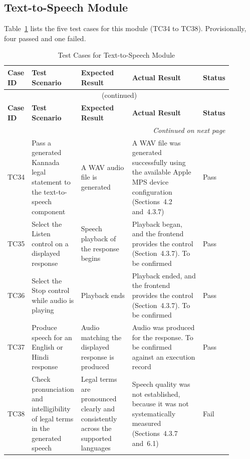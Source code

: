 \documentclass[12pt,a4paper,oneside]{report}
\begin{document}
\subsection{Text-to-Speech Module}
Table~\ref{tab:tts} lists the five test cases for this module (TC34 to TC38). Provisionally, four passed and one failed.
{\footnotesize
\setlength{\tabcolsep}{3pt}
\renewcommand{\arraystretch}{1.15}
\begin{longtable}{|p{0.075\linewidth}|p{0.19\linewidth}|p{0.23\linewidth}|p{0.32\linewidth}|p{0.08\linewidth}|}
\caption{Test Cases for Text-to-Speech Module}\label{tab:tts}\\
\hline
\textbf{Case ID} & \textbf{Test Scenario} & \textbf{Expected Result} & \textbf{Actual Result} & \textbf{Status}\\
\hline
\endfirsthead
\multicolumn{5}{c}{\tablename~\thetable{} (continued)}\\
\hline
\textbf{Case ID} & \textbf{Test Scenario} & \textbf{Expected Result} & \textbf{Actual Result} & \textbf{Status}\\
\hline
\endhead
\hline
\multicolumn{5}{r}{\emph{Continued on next page}}\\
\endfoot
\hline
\endlastfoot
TC34 & Pass a generated Kannada legal statement to the text-to-speech component & A WAV audio file is generated & A WAV file was generated successfully using the available Apple MPS device configuration (Sections~4.2 and~4.3.7) & Pass\\
\hline
TC35 & Select the Listen control on a displayed response & Speech playback of the response begins & Playback began, and the frontend provides the control (Section~4.3.7). To be confirmed & Pass\\
\hline
TC36 & Select the Stop control while audio is playing & Playback ends & Playback ended, and the frontend provides the control (Section~4.3.7). To be confirmed & Pass\\
\hline
TC37 & Produce speech for an English or Hindi response & Audio matching the displayed response is produced & Audio was produced for the response. To be confirmed against an execution record & Pass\\
\hline
TC38 & Check pronunciation and intelligibility of legal terms in the generated speech & Legal terms are pronounced clearly and consistently across the supported languages & Speech quality was not established, because it was not systematically measured (Sections~4.3.7 and~6.1) & Fail\\
\end{longtable}
}
\end{document}
